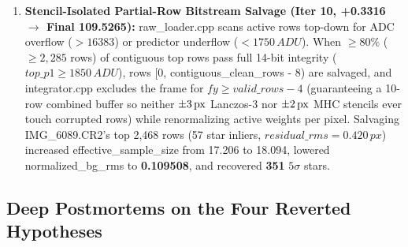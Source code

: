 \documentclass[10pt,twocolumn,letterpaper]{article}
\DeclareRobustCommand{\code}[1]{\texttt{#1}}
\def\code#1{#1}%
\begin{document}
\begin{enumerate}
  \item \textbf{Stencil-Isolated Partial-Row Bitstream Salvage (\code{Iter 10}, \code{+0.3316} $\to$ Final \code{109.5265}):}
  \code{raw\_loader.cpp} scans active rows top-down for ADC overflow ($> \code{16383}$) or predictor underflow ($< \code{1750\,ADU}$). When $\ge 80\%$ ($\ge 2{,}285$ rows) of contiguous top rows pass full 14-bit integrity ($\code{top\_p1} \ge \code{1850\,ADU}$), rows \code{[0, contiguous\_clean\_rows - 8)} are salvaged, and \code{integrator.cpp} excludes the frame for $\code{fy} \ge \code{valid\_rows} - 4$ (guaranteeing a 10-row combined buffer so neither $\pm 3\text{\,px}$ Lanczos-3 nor $\pm 2\text{\,px}$ MHC stencils ever touch corrupted rows) while renormalizing active weights per pixel. Salvaging \code{IMG\_6089.CR2}'s top \code{2,468} rows (\code{57} star inliers, $\code{residual\_rms} = \code{0.420\,px}$) increased \code{effective\_sample\_size} from \code{17.206} to \code{18.094}, lowered \code{normalized\_bg\_rms} to \textbf{\code{0.109508}}, and recovered \textbf{\code{351}} $5\sigma$ stars.
\end{enumerate}

\subsection{Deep Postmortems on the Four Reverted Hypotheses}
\end{document}

